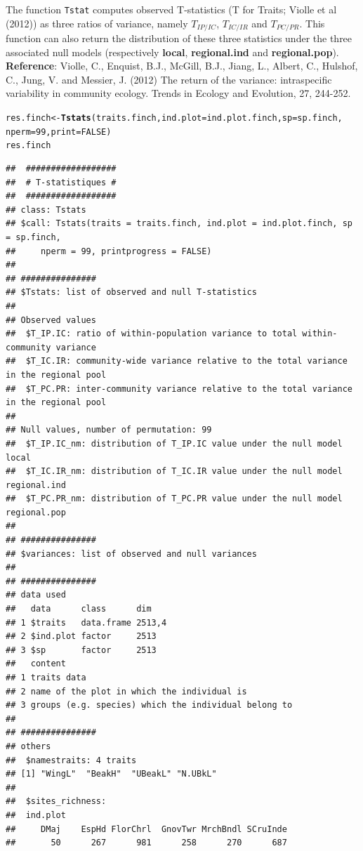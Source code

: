 \documentclass[12pt]{article}\usepackage[]{graphicx}\usepackage[]{color}
\makeatletter
\newcommand{\hlnum}[1]{\textcolor[rgb]{0.686,0.059,0.569}{#1}}%
\newcommand{\hlstd}[1]{\textcolor[rgb]{0.345,0.345,0.345}{#1}}%
\newcommand{\hlkwb}[1]{\textcolor[rgb]{0.69,0.353,0.396}{#1}}%
\newcommand{\hlkwc}[1]{\textcolor[rgb]{0.333,0.667,0.333}{#1}}%
\newcommand{\hlkwd}[1]{\textcolor[rgb]{0.737,0.353,0.396}{\textbf{#1}}}%
\newenvironment{kframe}{%
 \def\at@end@of@kframe{}%
 \ifinner\ifhmode%
  \def\at@end@of@kframe{\end{minipage}}%
  \begin{minipage}{\columnwidth}%
 \fi\fi%
 \def\FrameCommand##1{\hskip\@totalleftmargin \hskip-\fboxsep
 \colorbox{shadecolor}{##1}\hskip-\fboxsep
     \hskip-\linewidth \hskip-\@totalleftmargin \hskip\columnwidth}%
 \MakeFramed {\advance\hsize-\width
   \@totalleftmargin\z@ \linewidth\hsize
   \@setminipage}}%
 {\par\unskip\endMakeFramed%
 \at@end@of@kframe}
\newenvironment{knitrout}{}{} %
\makeatother
\begin{document}
The function \texttt{Tstat} computes observed T-statistics (T for Traits; Violle et al (2012)) as three ratios of variance, namely $T_{IP/IC}$, $T_{IC/IR}$ and $T_{PC/PR}$. This function can also return the distribution of these three statistics under the three associated null models (respectively \textbf{local}, \textbf{regional.ind} and \textbf{regional.pop}).
~\\

\textbf{Reference}: Violle, C., Enquist, B.J., McGill, B.J., Jiang, L., Albert, C., Hulshof, C., Jung, V. and Messier, J. (2012) The return of the variance: intraspecific variability in community ecology. Trends in Ecology and Evolution, 27, 244-252.

\begin{knitrout}
\color{fgcolor}\begin{kframe}
\begin{alltt}
\hlstd{res.finch} \hlkwb{<-} \hlkwd{Tstats}\hlstd{(traits.finch,} \hlkwc{ind.plot} \hlstd{= ind.plot.finch,} \hlkwc{sp} \hlstd{= sp.finch,}
         \hlkwc{nperm} \hlstd{=} \hlnum{99}\hlstd{,} \hlkwc{print} \hlstd{=} \hlnum{FALSE}\hlstd{)}
\hlstd{res.finch}
\end{alltt}
\begin{verbatim}
## 	##################
## 	# T-statistiques #
## 	##################
## class: Tstats
## $call: Tstats(traits = traits.finch, ind.plot = ind.plot.finch, sp = sp.finch, 
##     nperm = 99, printprogress = FALSE)
## 
## ###############
## $Tstats: list of observed and null T-statistics
## 
## Observed values
## 	$T_IP.IC: ratio of within-population variance to total within-community variance
## 	$T_IC.IR: community-wide variance relative to the total variance in the regional pool
## 	$T_PC.PR: inter-community variance relative to the total variance in the regional pool
## 
## Null values, number of permutation: 99
## 	$T_IP.IC_nm: distribution of T_IP.IC value under the null model local
## 	$T_IC.IR_nm: distribution of T_IC.IR value under the null model regional.ind 
## 	$T_PC.PR_nm: distribution of T_PC.PR value under the null model regional.pop
## 
## ###############
## $variances: list of observed and null variances
## 
## ###############
## data used
##   data      class      dim   
## 1 $traits   data.frame 2513,4
## 2 $ind.plot factor     2513  
## 3 $sp       factor     2513  
##   content                                             
## 1 traits data                                         
## 2 name of the plot in which the individual is         
## 3 groups (e.g. species) which the individual belong to
## 
## ###############
## others
## 	$namestraits: 4 traits
## [1] "WingL"  "BeakH"  "UBeakL" "N.UBkL"
## 
## 	$sites_richness:
## 	ind.plot
##     DMaj    EspHd FlorChrl  GnovTwr MrchBndl SCruInde 
##       50      267      981      258      270      687
\end{verbatim}
\end{kframe}
\end{knitrout}
\end{document}
